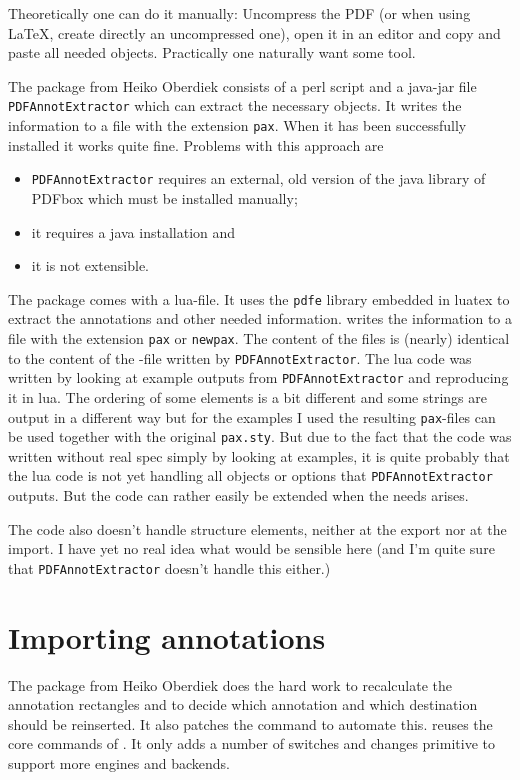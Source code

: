 \documentclass[DIV=12,parskip=half-,bibliography=totoc]{scrartcl}
\begin{document}
Theoretically one can do it manually: Uncompress the PDF (or when using \LaTeX, create directly an uncompressed one), open it in an editor and copy and paste all needed objects. Practically one naturally want some tool.

The  package from Heiko Oberdiek consists of a perl script and a java-jar file \texttt{PDFAnnotExtractor} which can extract the necessary objects. It writes the information to a file with the extension \texttt{pax}.
When it has been successfully installed it works quite fine. Problems with this approach are
\begin{itemize}
\item \texttt{PDFAnnotExtractor} requires an external, old version of the java library of PDFbox which must be installed manually;
\item it requires a java installation and
\item it is not extensible.
\end{itemize}

The  package comes with a lua-file. It uses the \texttt{pdfe} library embedded in luatex to extract the annotations and other needed information.  writes the information to a file with the extension \texttt{pax} or \texttt{newpax}. The content of the files is (nearly) identical to the content of the -file written by \texttt{PDFAnnotExtractor}. The lua code was written by looking at example outputs from \texttt{PDFAnnotExtractor} and reproducing it in lua. The ordering of some elements is a bit different and some strings are output in a different way but for the examples I used the resulting \texttt{pax}-files can be used together with the original \texttt{pax.sty}. But due to the fact that the code was written without real spec simply by looking at examples, it is quite probably that the lua code is not yet handling all objects or options that \texttt{PDFAnnotExtractor} outputs.  But the code can rather easily be extended when the needs arises.

The code also doesn't handle structure elements, neither at the export nor at the import. I have yet no real idea what would be sensible here (and I'm quite sure that \texttt{PDFAnnotExtractor}  doesn't handle this either.)


\section{Importing annotations}

The  package from Heiko Oberdiek does the hard work to recalculate the annotation rectangles and to decide which annotation and which destination should be reinserted. It also patches the  command to automate this.
 reuses the core commands of . It only adds a number of switches and changes primitive to support more engines and backends.
\end{document}

